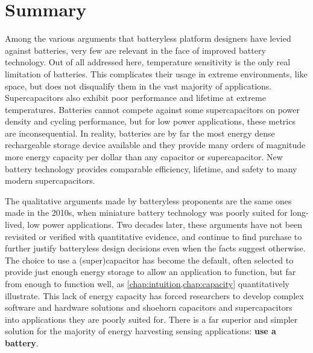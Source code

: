 
\section{Summary}
Among the various arguments that batteryless platform designers have levied against batteries, very few are relevant in the face of improved battery technology. Out of all addressed here, temperature sensitivity is the only real limitation of batteries. This complicates their usage in extreme environments, like space, but does not disqualify them in the vast majority of applications. Supercapacitors also exhibit poor performance and lifetime at extreme temperatures.
Batteries cannot compete against some supercapacitors on power density and cycling performance, but for low power applications, these metrics are inconsequential. 
In reality, batteries are by far the most energy dense rechargeable storage device available and they provide many orders of magnitude more energy capacity per dollar than any capacitor or supercapacitor. New battery technology provides comparable efficiency, lifetime, and safety to many modern supercapacitors. 

The qualitative arguments made by batteryless proponents are the same ones made in the 2010s, when miniature battery technology was poorly suited for long-lived, low power applications. Two decades later, these arguments have not been revisited or verified with quantitative evidence, and continue to find purchase to further justify batteryless design decisions even when the facts suggest otherwise.
The choice to use a (super)capacitor has become the default, often selected to provide just enough energy storage to allow an application to function, but far from enough to function well, as \cref{chap:intuition,chap:capacity} quantitatively illustrate. This lack of energy capacity has forced researchers to develop complex software and hardware solutions and shoehorn capacitors and supercapacitors into applications they are poorly suited for. There is a far superior and simpler solution for the majority of energy harvesting sensing applications: \textbf{use a battery}.

